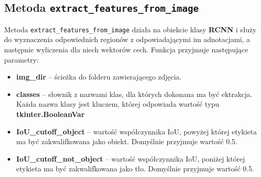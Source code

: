 \documentclass[a4paper,twoside,12pt]{book}
\begin{document}
\subsection{Metoda \lstinline|extract_features_from_image|}
{Metoda \lstinline|extract_features_from_image| działa na obiekcie klasy \textbf{RCNN} i służy do wyznaczenia odpowiednich regionów z odpowiadającymi im adnotacjami, a następnie wyliczenia dla niech wektorów cech. Funkcja przyjmuje  następujące parametry:}
\begin{itemize}
\item {\textbf{img\_dir} – ścieżka do folderu zawierającego zdjęcia.}
\item {\textbf{classes} – słownik z nazwami klas, dla których dokonana ma być ektrakcja. Każda nazwa klasy jest kluczem, której odpowiada wartość typu \textbf{tkinter.BooleanVar}}
\item {\textbf{IoU\_cutoff\_object} – wartość współczynnika IoU, powyżej której etykieta ma być zakwalifkowana jako obiekt. Domyślnie przyjmuje wartość 0.5.}
\item {\textbf{IoU\_cutoff\_not\_object} – wartość współczynnika IoU, poniżej której etykieta ma być zakwalifkowana jako tło. Domyślnie przyjmuje wartość 0.5.}
\end{itemize}
\end{document}
